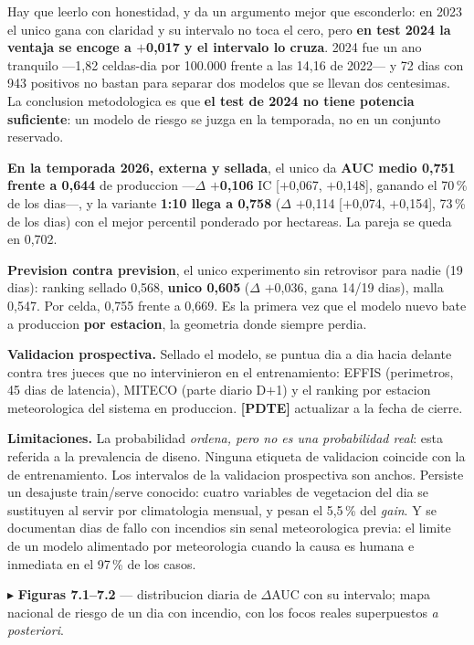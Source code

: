 \documentclass[10pt,a4paper]{article}
\newcommand{\pdte}[1]{{\color{red}\footnotesize\textbf{[PDTE]} #1}}
\newcommand{\fig}[2]{{\color{blue}\footnotesize$\blacktriangleright$ \textbf{#1} --- #2\par}}
\begin{document}
Hay que leerlo con honestidad, y da un argumento mejor que esconderlo: en 2023 el unico gana con
claridad y su intervalo no toca el cero, pero \textbf{en test 2024 la ventaja se encoge a $+$0,017 y
el intervalo lo cruza}. 2024 fue un ano tranquilo ---1,82 celdas-dia por 100.000 frente a las 14,16
de 2022--- y 72 dias con 943 positivos no bastan para separar dos modelos que se llevan dos
centesimas. La conclusion metodologica es que \textbf{el test de 2024 no tiene potencia
suficiente}: un modelo de riesgo se juzga en la temporada, no en un conjunto reservado.

\textbf{En la temporada 2026, externa y sellada}, el unico da \textbf{AUC medio 0,751 frente a
0,644} de produccion ---$\Delta$ \textbf{$+$0,106} IC [$+$0,067, $+$0,148], ganando el 70\,\% de los
dias---, y la variante \textbf{1:10 llega a 0,758} ($\Delta$ $+$0,114 [$+$0,074, $+$0,154], 73\,\%
de los dias) con el mejor percentil ponderado por hectareas. La pareja se queda en 0,702.

\textbf{Prevision contra prevision}, el unico experimento sin retrovisor para nadie (19 dias):
ranking sellado 0,568, \textbf{unico 0,605} ($\Delta$ $+$0,036, gana 14/19 dias), malla 0,547. Por
celda, 0,755 frente a 0,669. Es la primera vez que el modelo nuevo bate a produccion \textbf{por
estacion}, la geometria donde siempre perdia.

\textbf{Validacion prospectiva.} Sellado el modelo, se puntua dia a dia hacia delante contra tres
jueces que no intervinieron en el entrenamiento: EFFIS (perimetros, 45 dias de latencia), MITECO
(parte diario D$+$1) y el ranking por estacion meteorologica del sistema en produccion.
\pdte{actualizar a la fecha de cierre.}

\textbf{Limitaciones.} La probabilidad \emph{ordena, pero no es una probabilidad real}: esta
referida a la prevalencia de diseno. Ninguna etiqueta de validacion coincide con la de
entrenamiento. Los intervalos de la validacion prospectiva son anchos. Persiste un desajuste
train/serve conocido: cuatro variables de vegetacion del dia se sustituyen al servir por
climatologia mensual, y pesan el 5,5\,\% del \emph{gain}. Y se documentan dias de fallo con
incendios sin senal meteorologica previa: el limite de un modelo alimentado por meteorologia cuando
la causa es humana e inmediata en el 97\,\% de los casos.

\fig{Figuras 7.1--7.2}{distribucion diaria de $\Delta$AUC con su intervalo; mapa nacional de riesgo
de un dia con incendio, con los focos reales superpuestos \emph{a posteriori}.}
\end{document}

